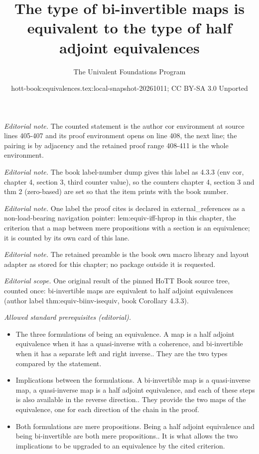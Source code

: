 \documentclass[10pt,a4paper]{article}
\title{The type of bi-invertible maps is equivalent to the type of half adjoint equivalences}
\author{The Univalent Foundations Program}
\date{hott-book:equivalences.tex:local-snapshot-20261011; CC BY-SA 3.0 Unported}
\newcounter{chapter}
\theoremstyle{definition}
\theoremstyle{remark}
\numberwithin{equation}{section}
\begin{document}
\maketitle
\setcounter{chapter}{4}
\setcounter{section}{3}
\setcounter{thm}{2}
\noindent\textit{Editorial note.} The counted statement is the author cor environment at source lines 405-407 and its proof environment opens on line 408, the next line; the pairing is by adjacency and the retained proof range 408-411 is the whole environment.\par\medskip
\noindent\textit{Editorial note.} The book label-number dump gives this label as 4.3.3 (env cor, chapter 4, section 3, third counter value), so the counters chapter 4, section 3 and thm 2 (zero-based) are set so that the item prints with the book number.\par\medskip
\noindent\textit{Editorial note.} One label the proof cites is declared in external\_references as a non-load-bearing navigation pointer: lem:equiv-iff-hprop in this chapter, the criterion that a map between mere propositions with a section is an equivalence; it is counted by its own card of this lane.\par\medskip
\noindent\textit{Editorial note.} The retained preamble is the book own macro library and layout adapter as stored for this chapter; no package outside it is requested.\par\medskip
\noindent\textit{Editorial scope.} One original result of the pinned HoTT Book source tree, counted once: bi-invertible maps are equivalent to half adjoint equivalences (author label thm:equiv-biinv-isequiv, book Corollary 4.3.3).\par\medskip
\noindent\textit{Allowed standard prerequisites (editorial).}\begin{itemize}
\item The three formulations of being an equivalence. A map is a half adjoint equivalence when it has a quasi-inverse with a coherence, and bi-invertible when it has a separate left and right inverse.. They are the two types compared by the statement.
\item Implications between the formulations. A bi-invertible map is a quasi-inverse map, a quasi-inverse map is a half adjoint equivalence, and each of these steps is also available in the reverse direction.. They provide the two maps of the equivalence, one for each direction of the chain in the proof.
\item Both formulations are mere propositions. Being a half adjoint equivalence and being bi-invertible are both mere propositions.. It is what allows the two implications to be upgraded to an equivalence by the cited criterion.
\end{itemize}\medskip
\end{document}
